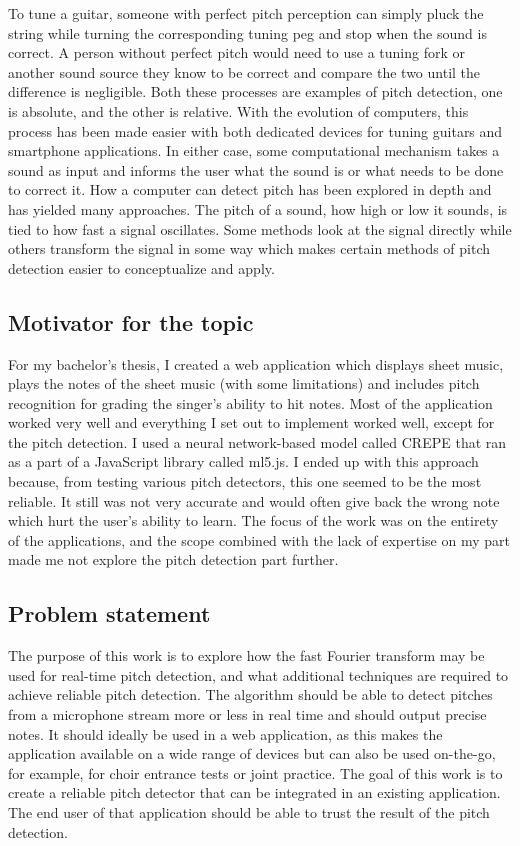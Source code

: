 To tune a guitar, someone with perfect pitch perception can simply pluck the string while turning the corresponding tuning peg and stop when the sound is correct. A person without perfect pitch would need to use a tuning fork or another sound source they know to be correct and compare the two until the difference is negligible. Both these processes are examples of pitch detection, one is absolute, and the other is relative. With the evolution of computers, this process has been made easier with both dedicated devices for tuning guitars and smartphone applications. In either case, some computational mechanism takes a sound as input and informs the user what the sound is or what needs to be done to correct it. How a computer can detect pitch has been explored in depth and has yielded many approaches. The pitch of a sound, how high or low it sounds, is tied to how fast a signal oscillates. Some methods look at the signal directly while others transform the signal in some way which makes certain methods of pitch detection easier to conceptualize and apply.

\subsection{Motivator for the topic}
For my bachelor's thesis, I created a web application which displays sheet music, plays the notes of the sheet music (with some limitations) and includes pitch recognition for grading the singer's ability to hit notes. Most of the application worked very well and everything I set out to implement worked well, except for the pitch detection. I used a neural network-based model called CREPE that ran as a part of a JavaScript library called ml5.js. I ended up with this approach because, from testing various pitch detectors, this one seemed to be the most reliable. It still was not very accurate and would often give back the wrong note which hurt the user's ability to learn. The focus of the work was on the entirety of the applications, and the scope combined with the lack of expertise on my part made me not explore the pitch detection part further.  

\subsection{Problem statement}
The purpose of this work is to explore how the fast Fourier transform may be used for real-time pitch detection, and what additional techniques are required to achieve reliable pitch detection. The algorithm should be able to detect pitches from a microphone stream more or less in real time and should output precise notes. It should ideally be used in a web application, as this makes the application available on a wide range of devices but can also be used on-the-go, for example, for choir entrance tests or joint practice. The goal of this work is to create a reliable pitch detector that can be integrated in an existing application. The end user of that application should be able to trust the result of the pitch detection. 
